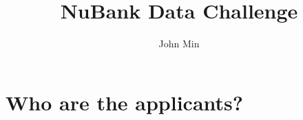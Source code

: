 \documentclass[a4paper, landscape]{article}
\begin{document}
\title{NuBank Data Challenge}

\author{John Min}
\maketitle

\newpage

\section*{Who are the applicants?}



\begin{center}

\end{center}
\end{document}
